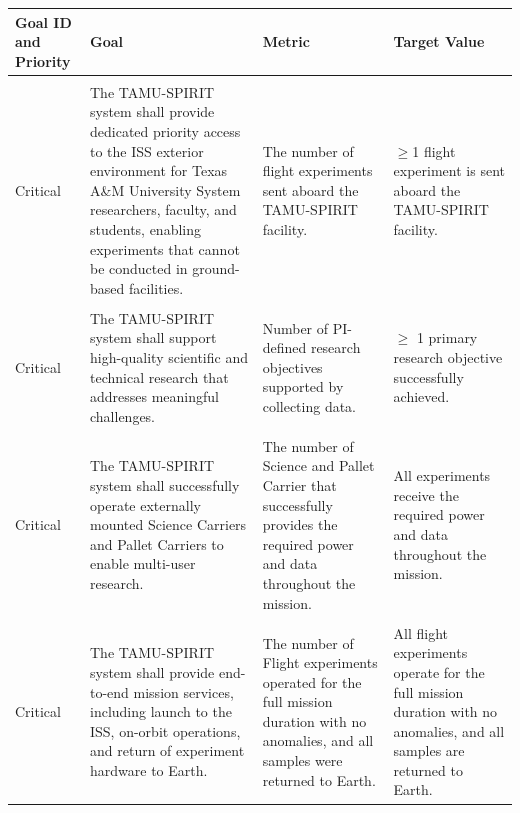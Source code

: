 \documentclass[conf]{new-aiaa}
\begin{document}
\begin{table}[!htbp]
    \centering
    \footnotesize
    \setlength{\tabcolsep}{4pt}
    \renewcommand{\arraystretch}{1.15}
    \begin{tabularx}{\textwidth}{@{}>{\centering\arraybackslash}m{1.9cm}
                                    >{\raggedright\arraybackslash}m{6.1cm}
                                    >{\raggedright\arraybackslash}m{3.3cm}
                                    >{\raggedright\arraybackslash}m{3.3cm}@{}}
    \toprule
    \textbf{Goal ID and Priority} & \textbf{Goal} & \textbf{Metric} & \textbf{Target Value} \\
    \midrule
    \shortstack[c]{\textbf{SG-1}\\Critical} &
    The TAMU-SPIRIT system shall provide dedicated priority access to the ISS exterior environment for Texas A\&M University System researchers, faculty, and students, enabling experiments that cannot be conducted in ground-based facilities. &
    The number of flight experiments sent aboard the TAMU-SPIRIT facility. &
    $\geq$1 flight experiment is sent aboard the TAMU-SPIRIT facility. \\ \hline

    \shortstack[c]{\textbf{SG-2}\\Critical} &
    The TAMU-SPIRIT system shall support high-quality scientific and technical research that addresses meaningful challenges. &
    Number of PI-defined research objectives supported by collecting data. &
    $\geq$ 1 primary research objective successfully achieved. \\ \hline

    \shortstack[c]{\textbf{SG-3}\\Critical} &
    The TAMU-SPIRIT system shall successfully operate externally mounted Science Carriers and Pallet Carriers to enable multi-user research. &
    The number of Science and Pallet Carrier that successfully provides the required power and data throughout the mission. &
    All experiments receive the required power and data throughout the mission. \\ \hline

    \shortstack[c]{\textbf{SG-4}\\Critical} &
    The TAMU-SPIRIT system shall provide end-to-end mission services, including launch to the ISS, on-orbit operations, and return of experiment hardware to Earth. &
    The number of Flight experiments operated for the full mission duration with no anomalies, and all samples were returned to Earth. &
    All flight experiments operate for the full mission duration with no anomalies, and all samples are returned to Earth. \\ \hline


\end{tabularx}
\end{table}
\end{document}
